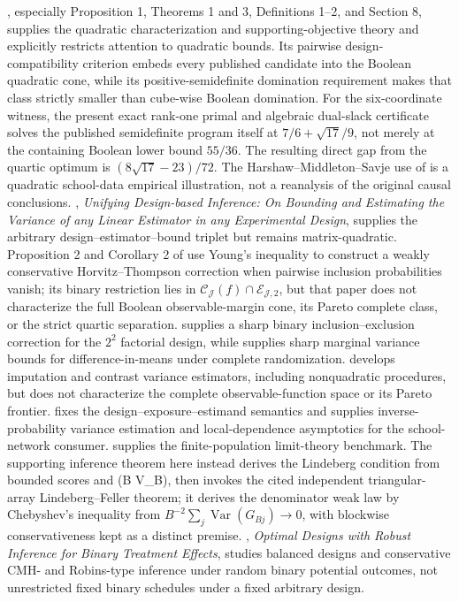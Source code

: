 \documentclass{article}
\begin{document}
\cite{HarshawMiddletonSavje2026}, especially Proposition 1, Theorems 1 and 3, Definitions 1--2, and Section 8, supplies the quadratic characterization and supporting-objective theory and explicitly restricts attention to quadratic bounds. Its pairwise design-compatibility criterion embeds every published candidate into the Boolean quadratic cone, while its positive-semidefinite domination requirement makes that class strictly smaller than cube-wise Boolean domination. For the six-coordinate witness, the present exact rank-one primal and algebraic dual-slack certificate solves the published semidefinite program itself at \(7/6+\sqrt{17}/9\), not merely at the containing Boolean lower bound \(55/36\). The resulting direct gap from the quartic optimum is \((8\sqrt{17}-23)/72\). The Harshaw--Middleton--Savje use of \cite{PaluckShepherdAronow2016} is a quadratic school-data empirical illustration, not a reanalysis of the original causal conclusions. \cite{Middleton2021Unifying}, \emph{Unifying Design-based Inference: On Bounding and Estimating the Variance of any Linear Estimator in any Experimental Design}, supplies the arbitrary design--estimator--bound triplet but remains matrix-quadratic. Proposition 2 and Corollary 2 of \cite{AronowSamii2013} use Young's inequality to construct a weakly conservative Horvitz--Thompson correction when pairwise inclusion probabilities vanish; its binary restriction lies in \(\mathcal C_{\mathcal J}(f)\cap\mathcal E_{\mathcal J,2}\), but that paper does not characterize the full Boolean observable-margin cone, its Pareto complete class, or the strict quartic separation. \cite{Lu2019FactorialBinary} supplies a sharp binary inclusion--exclusion correction for the \(2^2\) factorial design, while \cite{AronowGreenLee2014} supplies sharp marginal variance bounds for difference-in-means under complete randomization. \cite{ChattopadhyayImbens2025} develops imputation and contrast variance estimators, including nonquadratic procedures, but does not characterize the complete observable-function space or its Pareto frontier. \cite{AronowSamii2017Interference} fixes the design--exposure--estimand semantics and supplies inverse-probability variance estimation and local-dependence asymptotics for the school-network consumer. \cite{LiDing2017FPCLT} supplies the finite-population limit-theory benchmark. The supporting inference theorem here instead derives the Lindeberg condition from bounded scores and (B V\_B\to\infty), then invokes the cited independent triangular-array Lindeberg--Feller theorem; it derives the denominator weak law by Chebyshev's inequality from \(B^{-2}\sum_j\operatorname{Var}(G_{Bj})\to0\), with blockwise conservativeness kept as a distinct premise. \cite{AzrielKriegerKapelner2026}, \emph{Optimal Designs with Robust Inference for Binary Treatment Effects}, studies balanced designs and conservative CMH- and Robins-type inference under random binary potential outcomes, not unrestricted fixed binary schedules under a fixed arbitrary design.
\end{document}

